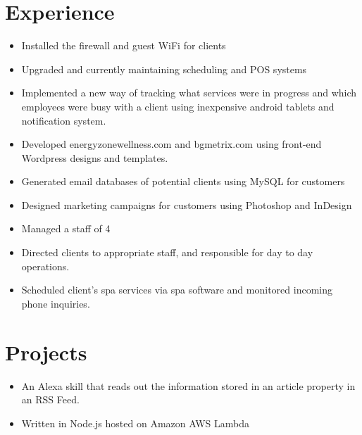 \documentclass[12pt,letterpaper,sans]{moderncv}        %
\begin{document}
\section{Experience}
{\begin{itemize}%
\item Installed the firewall and guest WiFi for clients
\item Upgraded and currently maintaining scheduling and POS systems
\item Implemented a new way of tracking what services were in progress and which employees were busy with a client using inexpensive android tablets and notification system.
\end{itemize}}
{\begin{itemize}%
\item Developed energyzonewellness.com and bgmetrix.com using front-end Wordpress designs and templates.
\item Generated email databases of potential clients using MySQL for customers
\item Designed marketing campaigns for customers using Photoshop and InDesign
\end{itemize}
  }
{\begin{itemize}%
\item Managed a staff of 4
\item Directed clients to appropriate staff, and responsible for day to day operations.
\item Scheduled client’s spa services via spa software and monitored incoming phone inquiries.
\end{itemize} }

\section{Projects}
{\begin{itemize}%
\item An Alexa skill that reads out the information stored in an article property in an RSS Feed.
\item Written in Node.js hosted on Amazon AWS Lambda \\
\end{itemize}}
\end{document}
